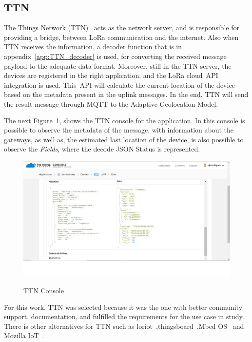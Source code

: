 \subsection{TTN} %
\label{sec:TTN}
The Things Network (TTN)~\cite{TTN} acts as the network server, and is responsible for providing a bridge, between LoRa communication and the internet. Also when TTN receives the information, a decoder function that is in appendix~\ref{app:TTN_decoder} is used, for converting the received message payload to the adequate data format.
Moreover, still in the TTN server, the devices are registered in the right application, and the LoRa cloud~\gls{API} integration is used. This~\gls{API} will calculate the current location of the device based on the metadata present in the uplink messages. In the end, TTN will send the result message through MQTT to the Adaptive Geolocation Model.

The next Figure~\ref{fig:TTN_Console}, shows the TTN console for the application. In this console is possible to observe the metadata of the message,  with information about the gateways, as well as, the estimated last location of the device, is also possible to observe the \emph{Fields}, where the decode JSON Status is represented.

\begin{figure}[htbp]
  \centering
  
    {\includegraphics[width=\linewidth]{Chapters/Figures/ttn2.JPG}}
 
  \caption{TTN Console}
  \label{fig:TTN_Console}
\end{figure}

For this work, TTN was selected because it was the one with better community support, documentation, and fulfilled the requirements for the use case in study. There is other alternatives for TTN such as  loriot~\cite{Loriot},thingsboard~\cite{ThingsBoard},Mbed OS~\cite{Mbed} and Mozilla IoT~\cite{Mozilla}. 


